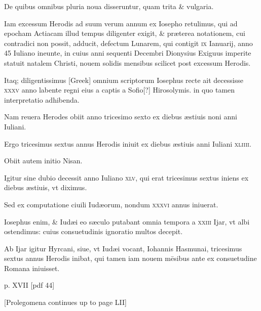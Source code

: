\begin{parnumbers}
De quibus omnibus pluria noua disseruntur, quam trita \& vulgaria.

Iam
excessum Herodis ad suum verum annum ex Iosepho retulimus,
qui ad epocham Actiacam illud tempus diligenter exigit, \& præterea
notationem, cui contradici non possit, adducit, defectum Lunarem,
qui contigit \textsc{ix} Ianuarij, anno 45 Iuliano ineunte, in cuius
anni sequenti Decembri Dionysius Exiguus imperite statuit natalem
Christi, nouem solidis mensibus scilicet post excessum Herodis.

Itaq; diligentissimus \textgreek{[Greek]} omnium scriptorum Iosephus
recte ait decessisse \textsc{xxxv} anno labente regni eius a captis a Sofio[?]
Hirosolymis. in quo tamen interpretatio adhibenda.

Nam reuera Herodes
obiit anno tricesimo sexto ex diebus æstiuis noni anni Iuliani.

Ergo tricesimus sextus annus Herodis iniuit ex diebus æstiuis anni
Iuliani \textsc{xliiii}.

Obiit autem initio Nisan.

Igitur sine dubio decessit
anno Iuliano \textsc{xlv}, qui erat tricesimus sextus iniens ex diebus æstiuis,
vt diximus.

Sed ex computatione ciuili Iudæorum, nondum
\textsc{xxxvi} annus iniuerat.

Iosephus enim, \& Iudæi eo sæculo putabant
omnia tempora a \textsc{xxiii} Ijar, vt albi ostendimus: cuius consuetudinis
ignoratio multos decepit.

Ab Ijar igitur Hyrcani, siue, vt Iudæi
vocant, Iohannis Hasmunai, tricesimus sextus annus Herodis inibat,
qui tamen iam nouem mēsibus ante ex consuetudine Romana iniuisset.

\clearpage
p. XVII [pdf 44]

[Prolegomena continues up to page LII]

\end{parnumbers}
